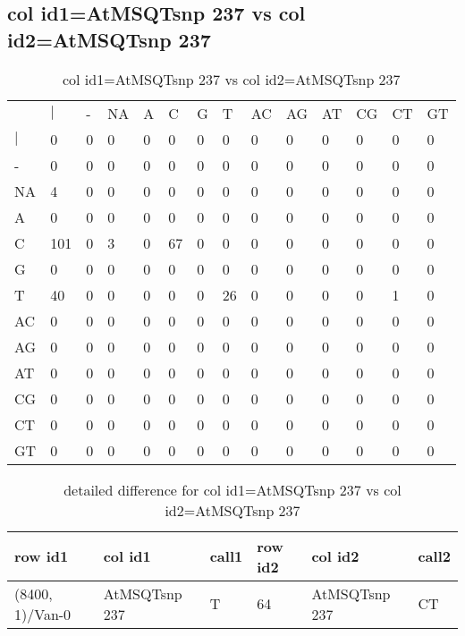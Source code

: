 \subsection{col id1=AtMSQTsnp 237 vs col id2=AtMSQTsnp 237}
\begin{center}
\begin{longtable}{|l|l|l|l|l|l|l|l|l|l|l|l|l|l|}
\caption{col id1=AtMSQTsnp 237 vs col id2=AtMSQTsnp 237} \label{table_dm594}\\
\hline
\\
\hline
&$|$&-&NA&A&C&G&T&AC&AG&AT&CG&CT&GT\\
$|$&0&0&0&0&0&0&0&0&0&0&0&0&0\\
-&0&0&0&0&0&0&0&0&0&0&0&0&0\\
NA&4&0&0&0&0&0&0&0&0&0&0&0&0\\
A&0&0&0&0&0&0&0&0&0&0&0&0&0\\
C&101&0&3&0&67&0&0&0&0&0&0&0&0\\
G&0&0&0&0&0&0&0&0&0&0&0&0&0\\
T&40&0&0&0&0&0&26&0&0&0&0&1&0\\
AC&0&0&0&0&0&0&0&0&0&0&0&0&0\\
AG&0&0&0&0&0&0&0&0&0&0&0&0&0\\
AT&0&0&0&0&0&0&0&0&0&0&0&0&0\\
CG&0&0&0&0&0&0&0&0&0&0&0&0&0\\
CT&0&0&0&0&0&0&0&0&0&0&0&0&0\\
GT&0&0&0&0&0&0&0&0&0&0&0&0&0\\
\hline
\end{longtable}
\end{center}

\begin{center}
\begin{longtable}{|l|l|l|l|l|l|}
\caption{detailed difference for col id1=AtMSQTsnp 237 vs col id2=AtMSQTsnp 237} \label{table_dm595}\\
\hline
row id1&col id1&call1&row id2&col id2&call2\\
\hline
(8400, 1)/Van-0&AtMSQTsnp 237&T&64&AtMSQTsnp 237&CT\\
\hline
\end{longtable}
\end{center}

